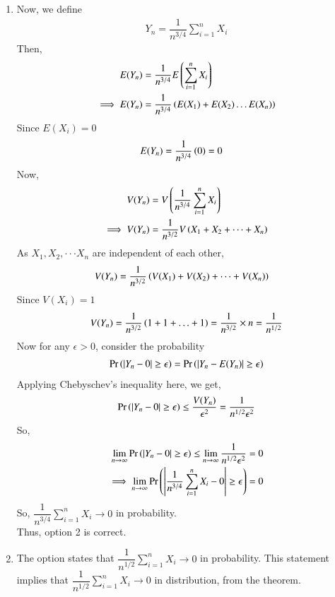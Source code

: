 \documentclass[journal,12pt,twocolumn]{IEEEtran}
\begin{document}
\begin{enumerate}
\item Now, we define
\begin{align}
    Y_n=\dfrac{1}{n^{3/4}}\sum_{i=1}^n X_i
\end{align}
Then,
\begin{align}
    E(Y_n) &= \dfrac{1}{n^{3/4}}E\left(\sum_{i=1}^n X_i\right) \\
    \implies E(Y_n) &= \dfrac{1}{n^{3/4}}\left(E(X_1)+E(X_2) \ldots E(X_n)\right)
\end{align}
Since $E(X_i) = 0$
\begin{align}
    E(Y_n) &= \dfrac{1}{n^{3/4}}\left(0\right) =0
\end{align}
Now,
\begin{align}
    V(Y_n) &= V\left(\dfrac{1}{n^{3/4}}\sum_{i=1}^n X_i\right) \\
    \implies V(Y_n) &= \dfrac{1}{n^{3/2}}V\left(X_1+X_2+ \dots +X_n\right)
\end{align}
As $X_1, X_2, \cdot \cdot \cdot X_n$ are independent of each other,
\begin{align}
    V(Y_n) &= \dfrac{1}{n^{3/2}}\left(V(X_1)+V(X_2)+ \dots +V(X_n)\right)
\end{align}
Since $V(X_i) = 1$
\begin{align}
    V(Y_n)=\dfrac{1}{n^{3/2}}\left(1+1+ \ldots +1\right)=\dfrac{1}{n^{3/2}}\times n=\dfrac{1}{n^{1/2}}
\end{align}
Now for any $\epsilon>0$, consider the probability
\begin{align}
    \Pr\left(|Y_n-0|\geq \epsilon\right)=\Pr\left(|Y_n-E(Y_n)|\geq \epsilon\right)
\end{align}
Applying Chebyschev's inequality here, we get,
\begin{align}
    \Pr\left(|Y_n-0|\geq \epsilon\right) \leq \dfrac{V(Y_n)}{\epsilon^2} = \dfrac{1}{n^{1/2}\epsilon^2}
\end{align}
So,
\begin{align}
    \lim_{n \to \infty}\Pr\left(|Y_n-0|\geq \epsilon\right) \leq \lim_{n \to \infty }\dfrac{1}{n^{1/2}\epsilon^2}=0\\
    \implies \lim_{n \to \infty}\Pr\left(\left | \dfrac{1}{n^{3/4}}\sum_{i=1}^n X_i - 0 \right|\geq \epsilon\right)=0
\end{align}
So, $\dfrac{1}{n^{3/4}}\sum_{i=1}^n X_i \to 0$ in probability.\\
Thus, option 2 is correct.

\item The option states that
\begin{math}
 \dfrac{1}{n^{1/2}} \sum_{i=1}^n X_i \to 0
\end{math} 
in probability. This statement implies that $\dfrac{1}{n^{1/2}} \sum_{i=1}^n X_i \to 0$ in distribution, from the theorem.


\end{enumerate}
\end{document}
